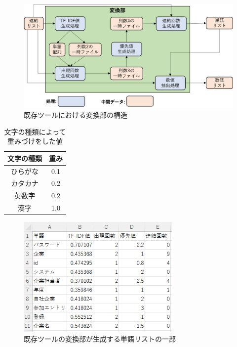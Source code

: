 \begin{figure}[p]
    \begin{center}
        \includegraphics[width=1.0\columnwidth]{image/exis_transfer_structure.png}
        \caption{既存ツールにおける変換部の構造}
        \label{fig:exis_transfer_structure}
    \end{center}
\end{figure}

\begin{table}[p]
    \begin{center}      
        \caption{文字の種類によって重みづけをした値}\label{table:yusenti}
        \begin{tabular}{c|c}
        文字の種類  & 重み \\ \hline \hline
        ひらがな & 0.1 \\ \hline
        カタカナ	 & 0.2\\ \hline
        英数字  & 0.2\\ \hline
        漢字 & 1.0\\ \hline
        \end{tabular}
    \end{center}
\end{table}

\begin{figure}[tp]
    \begin{center}
        \includegraphics[width=300]{image/exis_word_list.png}
        \caption{既存ツールの変換部が生成する単語リストの一部}
        \label{fig:exis_word_list}
    \end{center}
\end{figure}

